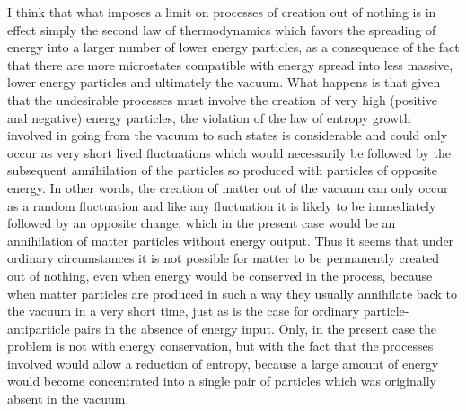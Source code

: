 \documentclass[notitlepage,12pt]{report}
\begin{document}
I think that what imposes a limit on processes of creation out of nothing is in effect simply the second law of thermodynamics which favors the spreading of energy into a larger number of lower energy particles, as a consequence of the fact that there are more microstates compatible with energy spread into less massive, lower energy particles and ultimately the vacuum. What happens is that given that the undesirable processes must involve the creation of very high (positive and negative) energy particles, the violation of the law of entropy growth involved in going from the vacuum to such states is considerable and could only occur as very short lived fluctuations which would necessarily be followed by the subsequent annihilation of the particles so produced with particles of opposite energy. In other words, the creation of matter out of the vacuum can only occur as a random fluctuation and like any fluctuation it is likely to be immediately followed by an opposite change, which in the present case would be an annihilation of matter particles without energy output. Thus it seems that under ordinary circumstances it is not possible for matter to be permanently created out of nothing, even when energy would be conserved in the process, because when matter particles are produced in such a way they usually annihilate back to the vacuum in a very short time, just as is the case for ordinary particle-antiparticle pairs in the absence of energy input. Only, in the present case the problem is not with energy conservation, but with the fact that the processes involved would allow a reduction of entropy, because a large amount of energy would become concentrated into a single pair of particles which was originally absent in the vacuum.
\end{document}
